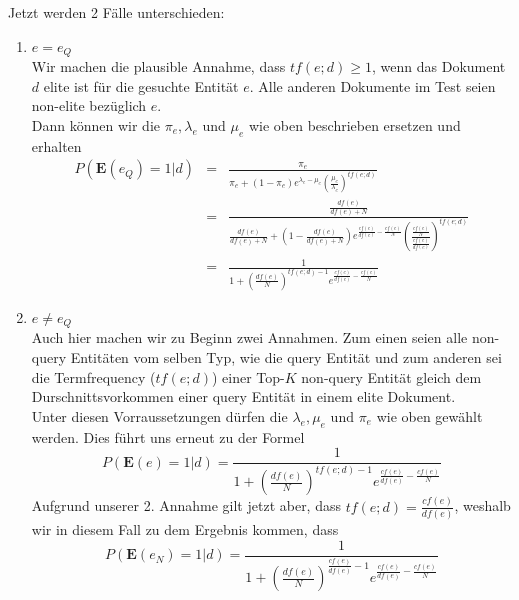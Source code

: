 Jetzt werden 2 Fälle unterschieden:
\begin{enumerate}
	\item $e=e_Q$ \\
		Wir machen die plausible Annahme, dass $tf(e;d) \geq 1$, wenn das Dokument $d$ elite ist für die gesuchte Entität $e$. Alle anderen Dokumente im Test seien non-elite bezüglich $e$. \\
		Dann können wir die $\pi_e, \lambda_e \text{ und } \mu_e$ wie oben beschrieben ersetzen und erhalten
		\begin{eqnarray*}
			P(\textbf{E}(e_Q)=1|d)	&=&	\frac{\pi_e}{\pi_e + (1-\pi_e)e^{\lambda_e - \mu_e}\left( \frac{\mu_e}{\lambda_e}\right)^{tf(e;d)}}\\
			&=&	\frac{\frac{df(e)}{df(e) + N}}{\frac{df(e)}{df(e) + N} + \left(1-\frac{df(e)}{df(e) + N}\right) e^{\frac{cf(e)}{df(e)}-\frac{cf(e)}{N}} \left( \frac{\frac{cf(e)}{N}}{\frac{cf(e)}{df(e)}}\right)^{tf(e;d)}}\\
			&=&	\frac{1}{1+ \left( \frac{df(e)}{N}\right)^{tf(e;d)-1}e^{\frac{cf(e)}{df(e)}-\frac{cf(e)}{N}}}
		\end{eqnarray*}

	\item $e \neq e_Q$ \\
		Auch hier machen wir zu Beginn zwei Annahmen. Zum einen seien alle non-query Entitäten vom selben Typ, wie die query Entität und zum anderen sei die Termfrequency ($tf(e;d)$) einer Top-$K$ non-query Entität gleich dem Durschnittsvorkommen einer query Entität in einem elite Dokument.\\
		Unter diesen Vorraussetzungen dürfen die $\lambda_e, \mu_e \text{ und } \pi_e$ wie oben gewählt werden. Dies führt uns erneut zu der Formel
		\[ 	P(\textbf{E}(e)=1|d) = \frac{1}{1+ \left( \frac{df(e)}{N}\right)^{tf(e;d)-1}e^{\frac{cf(e)}{df(e)}-\frac{cf(e)}{N}}} \]
		Aufgrund unserer 2. Annahme gilt jetzt aber, dass $tf(e;d) = \frac{cf(e)}{df(e)}$, weshalb wir in diesem Fall zu dem Ergebnis kommen, dass
		\[	P(\textbf{E}(e_N)=1|d) = \frac{1}{1+ \left( \frac{df(e)}{N}\right)^{\frac{cf(e)}{df(e)}-1}e^{\frac{cf(e)}{df(e)}-\frac{cf(e)}{N}}} \]
\end{enumerate}

